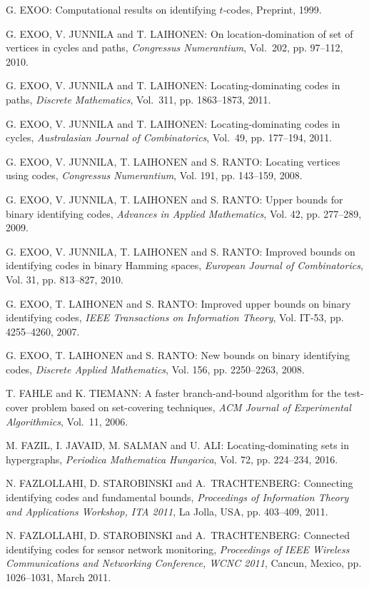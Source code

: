 \begin{thebibliography}{999}
G. EXOO: Computational results on identifying $t$-codes, Preprint, 1999.

G. EXOO, V. JUNNILA and T. LAIHONEN: On location-domination of set of vertices in cycles and paths, {\it Congressus Numerantium}, Vol.~202, pp. 97--112, 2010.

G. EXOO, V. JUNNILA and T. LAIHONEN: Locating-dominating codes in paths, {\it Discrete Mathematics}, Vol.~311, pp. 1863--1873, 2011.

G. EXOO, V. JUNNILA and T. LAIHONEN: Locating-dominating codes in cycles, {\it Australasian Journal of Combinatorics}, Vol.~49, pp. 177--194, 2011.

G. EXOO, V. JUNNILA, T. LAIHONEN and S. RANTO: Locating vertices using codes, {\it Congressus Numerantium}, Vol. 191, pp. 143--159, 2008.

G. EXOO, V. JUNNILA, T. LAIHONEN and S. RANTO: Upper bounds for binary identifying codes, {\it Advances in Applied Mathematics}, Vol. 42, pp. 277--289, 2009.

G. EXOO, V. JUNNILA, T. LAIHONEN and S. RANTO: Improved bounds on identifying codes in binary Hamming spaces, {\it European Journal of Combinatorics}, Vol. 31, pp. 813--827, 2010.

G. EXOO, T. LAIHONEN and S. RANTO: Improved upper bounds on binary identifying codes, {\it IEEE Transactions on Information Theory}, Vol. IT-53, pp. 4255--4260, 2007.

G. EXOO, T. LAIHONEN and S. RANTO: New bounds on binary identifying codes, {\it Discrete Applied Mathematics}, Vol. 156, pp. 2250--2263, 2008.

T. FAHLE and K. TIEMANN: A faster branch-and-bound algorithm for the test-cover problem based on set-covering techniques, {\it ACM Journal of Experimental Algorithmics}, Vol.~11, 2006.

M. FAZIL, I. JAVAID, M. SALMAN and U. ALI: Locating-dominating sets in hypergraphs, {\it Periodica Mathematica Hungarica}, Vol. 72,  pp. 224--234, 2016.

N. FAZLOLLAHI, D. STAROBINSKI and A.~TRACHTENBERG: Connecting identifying codes and fundamental bounds, {\it Proceedings of Information Theory and Applications Workshop, ITA 2011}, La Jolla, USA, pp. 403--409, 2011.

N. FAZLOLLAHI, D. STAROBINSKI and A.~TRACHTENBERG: Connected identifying codes for sensor network monitoring, {\it Proceedings of IEEE Wireless Communications and Networking Conference, WCNC 2011}, Cancun, Mexico, pp. 1026--1031, March 2011.


\end{thebibliography}
